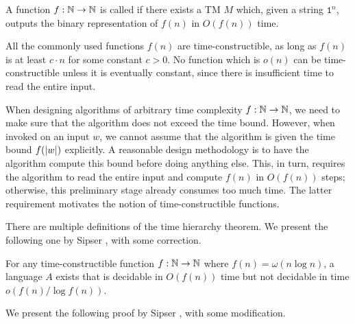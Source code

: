 \begin{definition}
  A function $f : \mathbb N \to \mathbb N$ is called  if there exists a TM $M$ which, given a string $\texttt{1}^n$, outputs the binary representation of $f(n)$ in $O(f(n))$ time.
\end{definition}

\begin{example}
  All the commonly used functions $f(n)$ are time-constructible, as long as $f(n)$ is at least $c \cdot n$ for some constant $c > 0$. No function which is $o(n)$ can be time-constructible unless it is eventually constant, since there is insufficient time to read the entire input.
\end{example}

When designing algorithms of arbitrary time complexity $f : \mathbb N \to \mathbb N$, we need to make sure that the algorithm does not exceed the time bound. However, when invoked on an input $w$, we cannot assume that the algorithm is given the time bound $f(| w |)$ explicitly. A reasonable design methodology is to have the algorithm compute this bound before doing anything else. This, in turn, requires the algorithm to read the entire input and compute $f(n)$ in $O(f(n))$ steps; otherwise, this preliminary stage already consumes too much time. The latter requirement motivates the notion of time-constructible functions.

There are multiple definitions of the time hierarchy theorem. We present the following one by Sipser \cite{sipser2013introduction}, with some correction.

\begin{theorem}
  For any time-constructible function $f : \mathbb N \to \mathbb N$ where $f(n) = \omega(n \log n)$, a language $A$ exists that is decidable in $O(f(n))$ time but not decidable in time $o(f(n) / \log f(n))$.
\end{theorem}

We present the following proof by Sipser \cite{sipser2013introduction}, with some modification.


